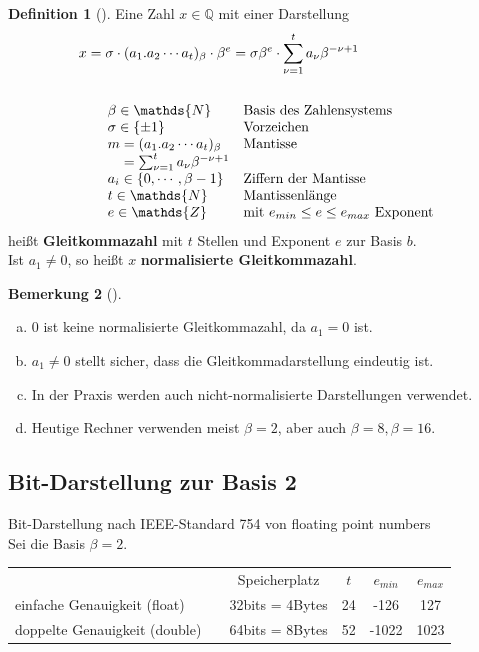 \documentclass[ngerman,fontsize=11pt, paper=a4, parskip=half, titlepage=true, toc=bib]{scrbook}
\theoremstyle{definition}
\newtheorem{Def}{Definition}[section]		%
\newtheorem{Bem}[Def]{Bemerkung}	%
\theoremstyle{plain}
\newcommand{\Q}{\mathds{Q}}
\newcommand{\N}{\mathds{N}}
\newcommand{\Z}{\mathds{Z}}
\newcommand{\subsectione}[1]{\subsection{#1} \addtocounter{Def}{1}}
\newenvironment{Beme}[1][]{ %
	\begin{Bem}[#1]
	}
	{
	\end{Bem}
	\addtocounter{subsection}{1}
}
\newenvironment{Defe}[1][]{ %
	\begin{Def}[#1]
	}
	{
	\end{Def}
	\addtocounter{subsection}{1}
}
\begin{document}
\begin{Defe}
	\label{3.1.1} 
	Eine Zahl $x\in\Q$ mit einer Darstellung
	\begin{align*}
	x&=\sigma \cdot(a_1 . a_2 \cdots a_t)_{\beta}\cdot \beta^e 
	= \sigma\beta^e \cdot \sum_{\nu=1}^{t}a_\nu \beta^{-\nu+1}\\\\
	&\quad\begin{array}{ll}
	\beta\in\N & \text{Basis des Zahlensystems}\index{Basis}\\
	\sigma \in\{\pm 1\} &\text{Vorzeichen} \\
	m = (a_1 . a_2 \cdots a_t)_{\beta} &\text{Mantisse}\index{Mantisse}\\
	\phantom{m}= \sum_{\nu=1}^{t}a_\nu \beta^{-\nu+1} \\
	a_i \in\{0,\cdots , \beta-1\}&\text{Ziffern der Mantisse}\\
	t\in\N&\text{Mantissenlänge} \\
	e\in\Z &\text{mit }e_{min}\leq e \leq e_{max} \text{ Exponent}
	\end{array}
	\end{align*}
	heißt \textbf{Gleitkommazahl} mit $t$ Stellen und Exponent $e$ zur Basis $b$. \\
	Ist $a_1\neq 0$, so heißt $x$ \textbf{normalisierte Gleitkommazahl}.
\end{Defe}

\begin{Beme}
	\label{3.1.2}~
	\begin{enumerate}[a)]
		\item 0 ist keine normalisierte Gleitkommazahl, da $a_1 =  0$ ist.
		\item $a_1\neq 0$ stellt sicher, dass die Gleitkommadarstellung eindeutig ist.
		\item In der Praxis werden auch nicht-normalisierte Darstellungen verwendet.
		\item Heutige Rechner verwenden meist $\beta =2$, aber auch $\beta=8, \beta=16$.
	\end{enumerate}
\end{Beme}

\subsectione{Bit-Darstellung zur Basis 2}
 \label{3.1.3}
Bit-Darstellung nach IEEE-Standard 754 von floating point numbers \\
Sei die Basis $\beta=2$.

\begin{tabular}{l@{}cccc@{}}
  & Speicherplatz & $t$ & $e_{min}$ & $e_{max}$ \\
  \cmidrule{2-5}
  einfache Genauigkeit (float) \index{floating point} & 32bits = 4Bytes & 24 &-126 & 127 \\
  doppelte  Genauigkeit (double)~~\index{double} & 64bits = 8Bytes& 52 & -1022 & 1023
\end{tabular}\\
\end{document}
